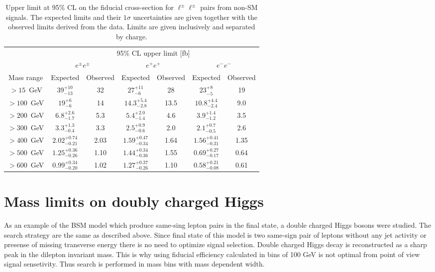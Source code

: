 \begin{table*}[!ht]
\begin{center}
\begin{tabular}{c||c|c||c|c||c|c}

 & \multicolumn{6}{c}{95\%  CL upper limit [fb]} \\
 & \multicolumn{2}{c||}{$e^{\pm}e^{\pm}$} & \multicolumn{2}{c||}{$e^{+}e^{+}$} & \multicolumn{2}{c}{$e^{-}e^{-}$} \\
Mass range & Expected & Observed & Expected & Observed & Expected & Observed \\
\hline
\rule{0pt}{3ex}
  $>15$~GeV   &  $39^{+10}_{-13}$        &  32    &    $27^{+11}_{-6}$         &  28    &    $23^{+8}_{-5}$          &  19\\
  $>100$~GeV  &  $19^{+6}_{-6}$          &  14    &    $14.3^{+5.4}_{-2.8}$    &  13.5  &    $10.8^{+4.4}_{-2.4}$    &  9.0\\
  $>200$~GeV  &  $6.8^{+2.6}_{-1.7}$     &  5.3   &    $5.4^{+2.0}_{-1.4}$     &  4.6   &    $3.9^{+1.4}_{-1.2}$     &  3.5\\
  $>300$~GeV  &  $3.3^{+1.3}_{-0.4}$     &  3.3   &    $2.5^{+0.9}_{-0.6}$     &  2.0   &    $2.1^{+0.7}_{-0.5}$     &  2.6\\
  $>400$~GeV  &  $2.02^{+0.74}_{-0.21}$  &  2.03  &    $1.59^{+0.47}_{-0.34}$  &  1.64  &    $1.56^{+0.41}_{-0.31}$  &  1.35\\
  $>500$~GeV  &  $1.25^{+0.36}_{-0.26}$  &  1.10  &    $1.44^{+0.34}_{-0.36}$  &  1.55  &    $0.69^{+0.27}_{-0.17}$  &  0.64\\
  $>600$~GeV  &  $0.99^{+0.34}_{-0.20}$  &  1.02  &    $1.27^{+0.37}_{-0.26}$  &  1.10  &    $0.58^{+0.21}_{-0.08}$  &  0.61\\

\end{tabular}
\end{center}
 \caption{Upper limit at 95\% CL on the fiducial cross-section for $\ell^{\pm} \ell^{\pm}$ pairs from non-SM signals. The expected limits and their $1 \sigma$ uncertainties are given together with the observed limits derived from the data. Limits are given inclusively and separated by charge.}
\label{tab:limits}
\end{table*}


\section{Mass limits on doubly charged Higgs}
As an example of the BSM model which produce same-sing lepton pairs in the final state, a double charged Higgs bosons were studied.
The search strategy are the same as described above.
Since final state of this model is two same-sign pair of leptons without any jet activity or presense of missing transverse energy 
there is no need to optimize signal selection.
Double charged Higgs decay is reconstructed as a sharp peak in the dilepton invariant mass.
This is why using fiducial efficiency calculated in bins of 100 GeV is not optimal from point of view signal sensetivity.
Thus search is performed in mass bins with mass dependent width.

